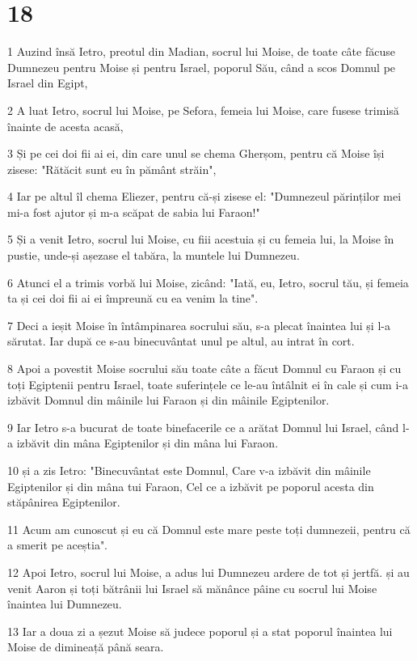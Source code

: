 \chapter{18}

\par 1 Auzind însă Ietro, preotul din Madian, socrul lui Moise, de toate câte făcuse Dumnezeu pentru Moise și pentru Israel, poporul Său, când a scos Domnul pe Israel din Egipt,
\par 2 A luat Ietro, socrul lui Moise, pe Sefora, femeia lui Moise, care fusese trimisă înainte de acesta acasă,
\par 3 Și pe cei doi fii ai ei, din care unul se chema Gherșom, pentru că Moise își zisese: "Rătăcit sunt eu în pământ străin",
\par 4 Iar pe altul îl chema Eliezer, pentru că-și zisese el: "Dumnezeul părinților mei mi-a fost ajutor și m-a scăpat de sabia lui Faraon!"
\par 5 Și a venit Ietro, socrul lui Moise, cu fiii acestuia și cu femeia lui, la Moise în pustie, unde-și așezase el tabăra, la muntele lui Dumnezeu.
\par 6 Atunci el a trimis vorbă lui Moise, zicând: "Iată, eu, Ietro, socrul tău, și femeia ta și cei doi fii ai ei împreună cu ea venim la tine".
\par 7 Deci a ieșit Moise în întâmpinarea socrului său, s-a plecat înaintea lui și l-a sărutat. Iar după ce s-au binecuvântat unul pe altul, au intrat în cort.
\par 8 Apoi a povestit Moise socrului său toate câte a făcut Domnul cu Faraon și cu toți Egiptenii pentru Israel, toate suferințele ce le-au întâlnit ei în cale și cum i-a izbăvit Domnul din mâinile lui Faraon și din mâinile Egiptenilor.
\par 9 Iar Ietro s-a bucurat de toate binefacerile ce a arătat Domnul lui Israel, când l-a izbăvit din mâna Egiptenilor și din mâna lui Faraon.
\par 10 și a zis Ietro: "Binecuvântat este Domnul, Care v-a izbăvit din mâinile Egiptenilor și din mâna tui Faraon, Cel ce a izbăvit pe poporul acesta din stăpânirea Egiptenilor.
\par 11 Acum am cunoscut și eu că Domnul este mare peste toți dumnezeii, pentru că a smerit pe aceștia".
\par 12 Apoi Ietro, socrul lui Moise, a adus lui Dumnezeu ardere de tot și jertfă. și au venit Aaron și toți bătrânii lui Israel să mănânce pâine cu socrul lui Moise înaintea lui Dumnezeu.
\par 13 Iar a doua zi a șezut Moise să judece poporul și a stat poporul înaintea lui Moise de dimineață până seara.
